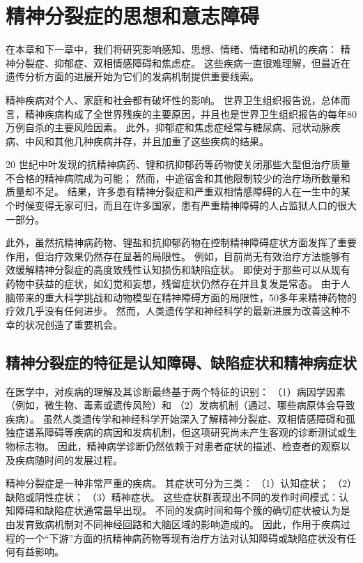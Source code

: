 \chapter{精神分裂症的思想和意志障碍} \label{chap:chap60}

在本章和下一章中，我们将研究影响感知、思想、情绪、情绪和动机的疾病： 
精神分裂症、抑郁症、双相情感障碍和焦虑症。
这些疾病一直很难理解，但最近在遗传分析方面的进展开始为它们的发病机制提供重要线索。


精神疾病对个人、家庭和社会都有破坏性的影响。
世界卫生组织报告说，总体而言，精神疾病构成了全世界残疾的主要原因，并且也是世界卫生组织报告的每年80万例自杀的主要风险因素。
此外，抑郁症和焦虑症经常与糖尿病、冠状动脉疾病、中风和其他几种疾病并存，并且加重了这些疾病的结果。


20 世纪中叶发现的抗精神病药、锂和抗抑郁药等药物使关闭那些大型但治疗质量不合格的精神病院成为可能；
然而，中途宿舍和其他限制较少的治疗场所数量和质量却不足。
结果，许多患有精神分裂症和严重双相情感障碍的人在一生中的某个时候变得无家可归，而且在许多国家，患有严重精神障碍的人占监狱人口的很大一部分。


此外，虽然抗精神病药物、锂盐和抗抑郁药物在控制精神障碍症状方面发挥了重要作用，但治疗效果仍然存在显著的局限性。
例如，目前尚无有效治疗方法能够有效缓解精神分裂症的高度致残性认知损伤和缺陷症状。
即使对于那些可以从现有药物中获益的症状，如幻觉和妄想，残留症状仍然存在并且复发是常态。
由于人脑带来的重大科学挑战和动物模型在精神障碍方面的局限性，50多年来精神药物的疗效几乎没有任何进步。
然而，人类遗传学和神经科学的最新进展为改善这种不幸的状况创造了重要机会。



\section{精神分裂症的特征是认知障碍、缺陷症状和精神病症状}

在医学中，对疾病的理解及其诊断最终基于两个特征的识别：
（1）病因学因素（例如，微生物、毒素或遗传风险）和 
（2）发病机制（通过、哪些病原体会导致疾病）。
虽然人类遗传学和神经科学开始深入了解精神分裂症、双相情感障碍和孤独症谱系障碍等疾病的病因和发病机制，但这项研究尚未产生客观的诊断测试或生物标志物。
因此，精神病学诊断仍然依赖于对患者症状的描述、检查者的观察以及疾病随时间的发展过程。


精神分裂症是一种非常严重的疾病。
其症状可分为三类：
（1）认知症状； 
（2）缺陷或阴性症状； 
（3）精神症状。
这些症状群表现出不同的发作时间模式：认知障碍和缺陷症状通常最早出现。
不同的发病时间和每个簇的确切症状被认为是由发育致病机制对不同神经回路和大脑区域的影响造成的。
因此，作用于疾病过程的一个“下游”方面的抗精神病药物等现有治疗方法对认知障碍或缺陷症状没有任何有益影响。


